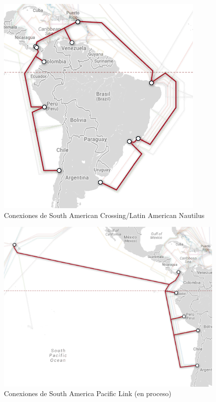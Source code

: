 \documentclass{article}
\begin{document}
\begin{figure}[H]
    \centering
    \includegraphics[scale=0.5]{SAC-LAN}
    \caption{Conexiones de South American Crossing/Latin American Nautilus}
\end{figure}

\begin{figure}[H]
    \centering
    \includegraphics[scale=0.5]{SAmPL}
    \caption{Conexiones de South America Pacific Link (en proceso)}
\end{figure}
\end{document}
